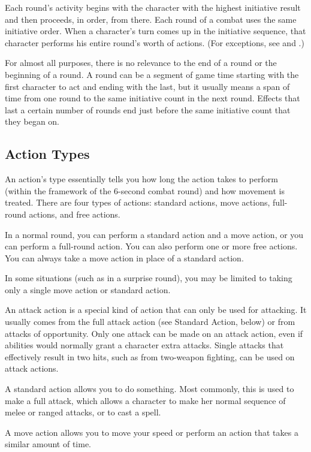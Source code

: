 Each round's activity begins with the character with the highest initiative result and then proceeds, in order, from there. Each round of a combat uses the same initiative order. When a character's turn comes up in the initiative sequence, that character performs his entire round's worth of actions. (For exceptions, see  and .)

For almost all purposes, there is no relevance to the end of a round or the beginning of a round. A round can be a segment of game time starting with the first character to act and ending with the last, but it usually means a span of time from one round to the same initiative count in the next round. Effects that last a certain number of rounds end just before the same initiative count that they began on.

\subsection{Action Types}
An action's type essentially tells you how long the action takes to perform (within the framework of the 6-second combat round) and how movement is treated. There are four types of actions: standard actions, move actions, full-round actions, and free actions.

In a normal round, you can perform a standard action and a move action, or you can perform a full-round action. You can also perform one or more free actions. You can always take a move action in place of a standard action.

In some situations (such as in a surprise round), you may be limited to taking only a single move action or standard action.

 An attack action is a special kind of action that can only be used for attacking. It usually comes from the full attack action (see Standard Action, below) or from attacks of opportunity. Only one attack can be made on an attack action, even if abilities would normally grant a character extra attacks. Single attacks that effectively result in two hits, such as from two-weapon fighting, can be used on attack actions.

 A standard action allows you to do something. Most commonly, this is used to make a full attack, which allows a character to make her normal sequence of melee or ranged attacks, or to cast a spell.

 A move action allows you to move your speed or perform an action that takes a similar amount of time.

